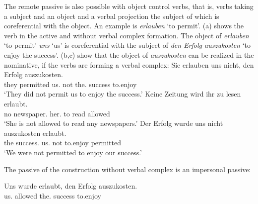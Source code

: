The remote passive is also possible with object control verbs, that is, verbs taking a subject and
an object and a verbal projection the subject of which is coreferential with the object. An example
is \emph{erlauben} `to permit'. (a) shows the verb in the active and without verbal complex
formation. The object of \emph{erlauben} `to permit' \emph{uns} `us' is coreferential with the
subject of \emph{den Erfolg auszukosten} `to enjoy the success'. (b,c) show that the object
of \emph{auszukosten} can be realized in the nominative, if the verbs are forming a verbal complex:
\eal
\label{bsp-auskosten-fernpassiv}
\ex 
\gll Sie erlauben uns nicht, den Erfolg auszukosten.\\
     they permitted us.\DAT{} not the.\ACC{} success to.enjoy\\
\glt `They did not permit us to enjoy the success.'
\ex{}
\gll Keine Zeitung          wird   ihr       zu lesen erlaubt.\footnotemark\\
     no    newspaper.\NOM{} \AUX{} her.\DAT{} to read  allowed\\
\glt `She is not allowed to read any newspapers.'%
\ex{}
\gll Der Erfolg         wurde  uns       nicht auszukosten erlaubt.\footnotemark\\
     the success.\NOM{} \AUX{} us.\DAT{} not   to.enjoy    permitted\\
\glt `We were not permitted to enjoy our success.'%
\label{bsp-auskosten-fernpassiv-haider}
\zl

\noindent
The passive of the construction without verbal complex is an impersonal passive:

\ea
\gll Uns       wurde  erlaubt, den        Erfolg  auszukosten.\\
     us.\DAT{} \AUX{} allowed  the.\ACC{} success to.enjoy\\
\z

